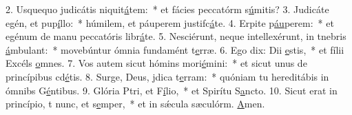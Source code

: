 2. Usquequo judicátis niquit\uline{á}tem:~* et fácies peccatórm s\uline{ú}mitis?
3. Judicáte egén, et pup\uline{í}llo:~* húmilem, et páuperem justifc\uline{á}te.
4. Erpite p\uline{áu}perem:~* et egénum de manu peccatóris libr\uline{á}te.
5. Nesciérunt, neque intellexérunt, in tnebris \uline{á}mbulant:~* movebúntur ómnia fundamént t\uline{e}rræ.
6. Ego dix: Dii \uline{e}stis,~* et fílii Excéls \uline{o}mnes.
7. Vos autem sicut hómins mori\uline{é}mini:~* et sicut unus de princípibus cd\uline{é}tis.
8. Surge, Deus, jdica t\uline{e}rram:~* quóniam tu hereditábis in ómnibs G\uline{é}ntibus.
9. Glória Ptri, et F\uline{í}lio,~* et Spirítu S\uline{a}ncto.
10. Sicut erat in princípio, t nunc, et s\uline{e}mper,~* et in sǽcula sæculórm. \uline{A}men.
